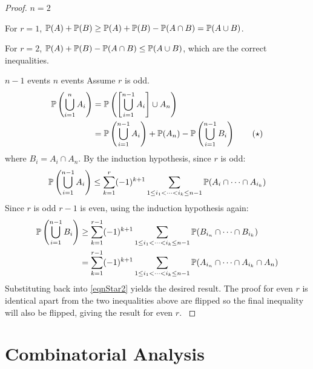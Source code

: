 \documentclass[../main.tex]{subfiles}
\begin{document}
\begin{proof}
  \induction
  {$n = 2$}{
    For $r = 1$, $\P(A) + \P(B) \geq \P(A) + \P(B) - \P(A \cap B) = \P(A \cup B)$.\par
    For $r = 2$, $\P(A) + \P(B) - \P(A \cap B) \leq \P(A \cup B)$, which are the correct inequalities.
  }
  {$n - 1$ events}{}
  {$n$ events}{
    Assume $r$ is odd.
    \begin{align*}
      \P\left(\bigcup_{i = 1}^{n} A_i\right) &= \P\left(\left[\bigcup_{i = 1}^{n - 1} A_i\right] \cup A_n\right) \\
                                             &= \P\left(\bigcup_{i = 1}^{n - 1} A_i\right) + \P(A_n) - \P\left(\bigcup_{i = 1}^{n - 1} B_i\right) \tag{$\star$} \label{eqnStar2}
    \end{align*}
    where $B_i = A_i \cap A_n$.
    By the induction hypothesis, since $r$ is odd:
    \[
      \P\left(\bigcup_{i = 1}^{n - 1} A_i\right) \leq \sum_{k = 1}^{r} (-1)^{k + 1} \sum_{1 \leq i_1 < \cdots < i_k \leq n - 1} \P(A_i \cap \cdots \cap A_{i_k})
    \]
    Since $r$ is odd $r - 1$ is even, using the induction hypothesis again:
    \begin{align*}
      \P\left(\bigcup_{i = 1}^{n - 1} B_i\right) &\geq \sum_{k = 1}^{r - 1} (-1)^{k + 1} \sum_{1 \leq i_1 < \cdots < i_k \leq n - 1} \P(B_{i_n} \cap \cdots \cap B_{i_k}) \\
                                                 &= \sum_{k = 1}^{r - 1} (-1)^{k + 1} \sum_{1 \leq i_1 < \cdots < i_k \leq n - 1} \P(A_{i_n} \cap \cdots \cap A_{i_k} \cap A_n)
    \end{align*}
    Substituting back into \cref{eqnStar2} yields the desired result.
    The proof for even $r$ is identical apart from the two inequalities above are flipped so the final inequality will also be flipped, giving the result for even $r$.
  }
\end{proof}
\section{Combinatorial Analysis}
\end{document}
